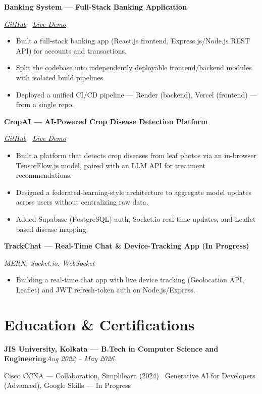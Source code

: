 \documentclass[10pt,a4paper]{article}
\newcommand{\heading}[2]{\noindent\textbf{#1}\hfill\textit{\small #2}\par}
\newcommand{\subheading}[1]{\noindent\textit{\small #1}\par\vspace{2pt}}
\begin{document}
\heading{Banking System --- Full-Stack Banking Application}{}
\subheading{\href{https://github.com/GwSaikat/Banking-System}{GitHub} \textbar\ \href{https://banking-system-sepia.vercel.app}{Live Demo}}
\begin{itemize}
    \item Built a full-stack banking app (React.js frontend, Express.js/Node.js REST API) for accounts and transactions.
    \item Split the codebase into independently deployable frontend/backend modules with isolated build pipelines.
    \item Deployed a unified CI/CD pipeline --- Render (backend), Vercel (frontend) --- from a single repo.
\end{itemize}

\heading{CropAI --- AI-Powered Crop Disease Detection Platform}{}
\subheading{\href{https://github.com/GwSaikat/CropAI}{GitHub} \textbar\ \href{https://cropai-app.vercel.app}{Live Demo}}
\begin{itemize}
    \item Built a platform that detects crop diseases from leaf photos via an in-browser TensorFlow.js model, paired with an LLM API for treatment recommendations.
    \item Designed a federated-learning-style architecture to aggregate model updates across users without centralizing raw data.
    \item Added Supabase (PostgreSQL) auth, Socket.io real-time updates, and Leaflet-based disease mapping.
\end{itemize}

\heading{TrackChat --- Real-Time Chat \& Device-Tracking App (In Progress)}{}
\subheading{MERN, Socket.io, WebSocket}
\begin{itemize}
    \item Building a real-time chat app with live device tracking (Geolocation API, Leaflet) and JWT refresh-token auth on Node.js/Express.
\end{itemize}

\enlargethispage{2\baselineskip}
\section*{Education \& Certifications}
\heading{JIS University, Kolkata --- B.Tech in Computer Science and Engineering}{Aug 2022 -- May 2026}
Cisco CCNA --- Collaboration, Simplilearn (2024) \textbar\ Generative AI for Developers (Advanced), Google Skills --- In Progress
\end{document}
